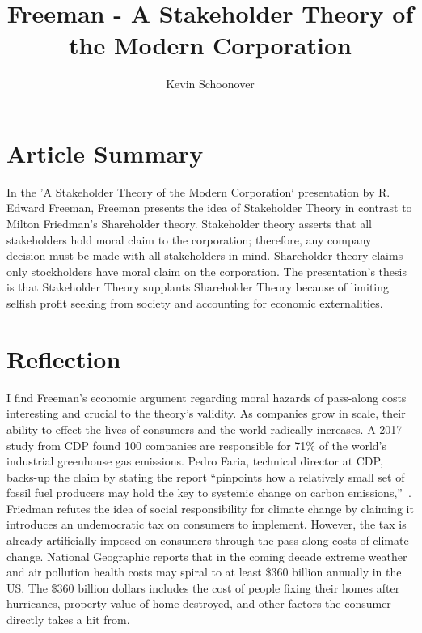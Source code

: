 \documentclass{article}
\begin{document}
\title{Freeman - A Stakeholder Theory of the Modern Corporation}
\author{Kevin Schoonover}

\maketitle

\section{Article Summary}
In the 'A Stakeholder Theory of the Modern Corporation` presentation by R.
Edward Freeman, Freeman presents the idea of Stakeholder Theory in contrast to
Milton Friedman's Shareholder theory. Stakeholder theory asserts that all
stakeholders hold moral claim to the corporation; therefore, any company
decision must be made with all stakeholders in mind. Shareholder theory claims
only stockholders have moral claim on the corporation. The presentation's thesis
is that Stakeholder Theory supplants Shareholder Theory because of limiting
selfish profit seeking from society and accounting for economic externalities.

\section{Reflection}

I find Freeman's economic argument regarding moral hazards of pass-along costs
interesting and crucial to the theory's validity. As companies grow in scale,
their ability to effect the lives of consumers and the world radically
increases. A 2017 study from CDP found 100 companies are responsible for 71\% of
the world's industrial greenhouse gas emissions. Pedro Faria, technical director
at CDP, backs-up the claim by stating the report “pinpoints how a relatively
small set of fossil fuel producers may hold the key to systemic change on carbon
emissions,”~\cite{cdp_report}. Friedman refutes the idea of social
responsibility for climate change by claiming it introduces an undemocratic tax
on consumers to implement. However, the tax is already artificially imposed on
consumers through the pass-along costs of climate change. National Geographic
reports that in the coming decade extreme weather and air pollution health costs
may spiral to at least \$360 billion annually in the US\cite{netgeo}. The \$360
billion dollars includes the cost of people fixing their homes after hurricanes,
property value of home destroyed, and other factors the consumer directly takes
a hit from.
\end{document}
